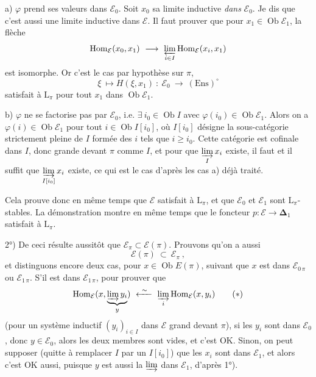 \documentclass[11pt]{article}
\newcommand{\msp}[1]{\marginpar{\footnotesize [#1]}}
\newcommand{\Ob}{\operatorname{Ob}}
\newcommand{\Hom}{\operatorname{Hom}}
\newcommand{\Ens}{\mathrm{Ens}}
\newcommand{\bDelta}{\boldsymbol{\Delta}}
\begin{document}
a) $\varphi$ prend ses valeurs dans $\mathcal{E}_0$. Soit $x_0$ sa limite inductive \textit{dans} $\mathcal{E}_0$. Je dis que c'est aussi une limite inductive dans $\mathcal{E}$. Il faut prouver que pour $x_1\in\Ob\mathcal{E}_1$, la flèche
\[
\Hom_{\mathcal{E}}(x_0,x_1)\ \longrightarrow\ \varprojlim_{i\in I}\Hom_{\mathcal{E}}(x_i,x_1)
\]
est isomorphe. Or c'est le cas
\msp{page 417}
par hypothèse sur $\pi$,
\[
\xi\ \longmapsto H(\xi,x_1)\ :\ \mathcal{E}_0\ \longrightarrow\ (\Ens)^{\circ}
\]
satisfait à $\mathrm{L}_\pi$ pour tout $x_1$ dans $\Ob\mathcal{E}_1$.

b) $\varphi$ ne se factorise pas par $\mathcal{E}_0$, i.e. $\exists\ i_0\in\Ob I$ avec $\varphi(i_0)\in\Ob\mathcal{E}_1$. Alors on a $\varphi(i)\in\Ob\mathcal{E}_1$ pour tout $i\in\Ob I[i_0]$, où $I[i_0]$ désigne la sous-catégorie strictement pleine de $I$ formée des $i$ tels que $i\geqslant i_0$. Cette catégorie est cofinale dans $I$, donc grande devant $\pi$ comme $I$, et pour que $\varinjlim\limits_{I}x_i$ existe, il faut et il suffit que $\varinjlim\limits_{I[i_0]}x_i$ existe, ce qui est le cas d'après les cas a) déjà traité. %

Cela prouve donc en même temps que $\mathcal{E}$ satisfait à $\mathrm{L}_\pi$, et que $\mathcal{E}_0$ et $\mathcal{E}_1$ sont $\mathrm{L}_\pi$-stables. La démonstration montre en même temps que le foncteur $p:\mathcal{E}\longrightarrow\bDelta_1$ satisfait à $\mathrm{L}_\pi$.

2°) De ceci résulte aussitôt que $\mathcal{E}_\pi\subset\mathcal{E}(\pi)$. Prouvons qu'on a aussi
\[
\mathcal{E}(\pi)\ \subset\ \mathcal{E}_\pi\ ,
\]
et distinguons encore deux cas, pour
\msp{page 418}
$x\in\Ob E(\pi)$, suivant que $x$ est dans $\mathcal{E}_{0\,\pi}$ ou $\mathcal{E}_{1\,\pi}$. S'il est dans $\mathcal{E}_{1\,\pi}$, pour prouver que %
\[
\Hom_{\mathcal{E}}(x,\underbrace{\varinjlim y_i}_{y})\ \xleftarrow{\ \sim\ }\ \varinjlim_{i}\Hom_{\mathcal{E}}(x,y_i)
\tag*{$(*)$}
\]
(pour un système inductif $(y_i)_{i\in I}$ dans $\mathcal{E}$ grand devant $\pi$), si les $y_i$ sont dans $\mathcal{E}_0$, donc $y\in\mathcal{E}_0$, alors les deux membres sont vides, et c'est OK. Sinon, on peut supposer (quitte à remplacer $I$ par un $I[i_0]$) que les $x_i$ sont dans $\mathcal{E}_1$, et alors c'est OK aussi, puisque $y$ est aussi la $\varinjlim$ dans $\mathcal{E}_1$, d'après 1°). %
\end{document}
